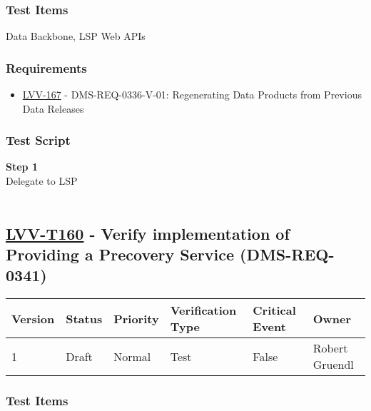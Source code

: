 \hypertarget{test-items-135}{%
\subsubsection{Test Items}\label{test-items-135}}

Data Backbone, LSP Web APIs~

\hypertarget{requirements-136}{%
\subsubsection{Requirements}\label{requirements-136}}

\begin{itemize}
\tightlist
\item
  \href{https://jira.lsstcorp.org/browse/LVV-167}{LVV-167} -
  DMS-REQ-0336-V-01: Regenerating Data Products from Previous Data
  Releases
\end{itemize}

\hypertarget{test-script-136}{%
\subsubsection{Test Script}\label{test-script-136}}

\textbf{Step 1}\\
Delegate to LSP\\
~\\

\hypertarget{lvv-t160---verify-implementation-of-providing-a-precovery-service-dms-req-0341}{%
\subsection{\texorpdfstring{\href{https://jira.lsstcorp.org/secure/Tests.jspa\#/testCase/LVV-T160}{LVV-T160}
- Verify implementation of Providing a Precovery Service
(DMS-REQ-0341)}{LVV-T160 - Verify implementation of Providing a Precovery Service (DMS-REQ-0341)}}\label{lvv-t160---verify-implementation-of-providing-a-precovery-service-dms-req-0341}}

\begin{longtable}[]{@{}llllll@{}}
\toprule
Version & Status & Priority & Verification Type & Critical Event &
Owner\tabularnewline
\midrule
\endhead
1 & Draft & Normal & Test & False & Robert Gruendl\tabularnewline
\bottomrule
\end{longtable}

\hypertarget{test-items-136}{%
\subsubsection{Test Items}\label{test-items-136}}

